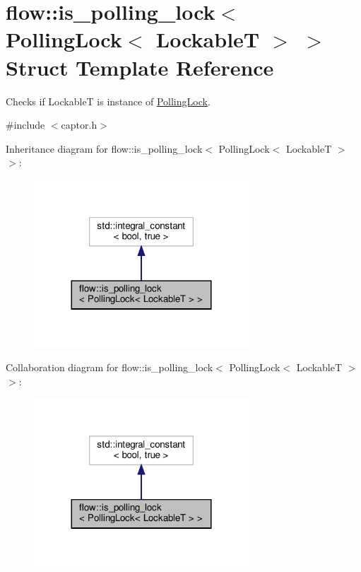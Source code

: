 \hypertarget{structflow_1_1is__polling__lock_3_01_polling_lock_3_01_lockable_t_01_4_01_4}{}\section{flow\+:\+:is\+\_\+polling\+\_\+lock$<$ Polling\+Lock$<$ LockableT $>$ $>$ Struct Template Reference}
\label{structflow_1_1is__polling__lock_3_01_polling_lock_3_01_lockable_t_01_4_01_4}


Checks if {\ttfamily LockableT} is instance of \hyperlink{structflow_1_1_polling_lock}{Polling\+Lock}.  




{\ttfamily \#include $<$captor.\+h$>$}



Inheritance diagram for flow\+:\+:is\+\_\+polling\+\_\+lock$<$ Polling\+Lock$<$ LockableT $>$ $>$\+:\nopagebreak
\begin{figure}[H]
\begin{center}
\leavevmode
\includegraphics[width=228pt]{structflow_1_1is__polling__lock_3_01_polling_lock_3_01_lockable_t_01_4_01_4__inherit__graph}
\end{center}
\end{figure}


Collaboration diagram for flow\+:\+:is\+\_\+polling\+\_\+lock$<$ Polling\+Lock$<$ LockableT $>$ $>$\+:\nopagebreak
\begin{figure}[H]
\begin{center}
\leavevmode
\includegraphics[width=228pt]{structflow_1_1is__polling__lock_3_01_polling_lock_3_01_lockable_t_01_4_01_4__coll__graph}
\end{center}
\end{figure}


